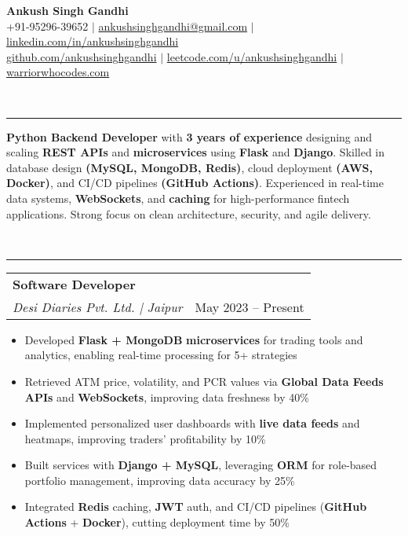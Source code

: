 \documentclass[a4paper,10.5pt]{article}
\makeatletter
\newcommand{\Section}[1]{\vspace{6pt}\noindent{\large\bfseries\MakeUppercase{#1}}\\\noindent\rule{\textwidth}{0.4pt}\vspace{6pt}}
\newcommand{\JobLine}[2]{\noindent\begin{tabular*}{\textwidth}{@{}l@{\extracolsep{\fill}}r@{}}#1 & #2\\\end{tabular*}}
\makeatother
\begin{document}
\vspace*{-0.9cm}
\begin{center}
  {\LARGE\bfseries Ankush Singh Gandhi}\\[3pt]
  +91-95296-39652 \; $|$ \; \href{mailto:ankushsinghgandhi@gmail.com}{ankushsinghgandhi@gmail.com} \; $|$ \; \href{https://linkedin.com/in/ankushsinghgandhi}{linkedin.com/in/ankushsinghgandhi} \\
  \href{https://github.com/ankushsinghgandhi}{github.com/ankushsinghgandhi} \; $|$ \; \href{https://leetcode.com/u/ankushsinghgandhi}{leetcode.com/u/ankushsinghgandhi} \; $|$ \; \href{https://warriorwhocodes.com/}{warriorwhocodes.com}
\end{center}

\Section{Summary}
{\small {\bfseries Python Backend Developer} with {\bfseries 3 years of experience} designing and scaling {\bfseries REST APIs} and {\bfseries microservices} using {\bfseries Flask} and {\bfseries Django}. Skilled in database design {\bfseries (MySQL, MongoDB, Redis)}, cloud deployment {\bfseries (AWS, Docker)}, and CI/CD pipelines {\bfseries (GitHub Actions)}. Experienced in real-time data systems, {\bfseries WebSockets}, and {\bfseries caching} for high-performance fintech applications. Strong focus on clean architecture, security, and agile delivery.}

\Section{Experience}

\JobLine{{\bfseries Software Developer}\\\textit{Desi Diaries Pvt. Ltd. | Jaipur}}{May 2023 -- Present}
\begin{itemize}
  \item Developed {\bfseries Flask + MongoDB} {\bfseries microservices} for trading tools and analytics, enabling real-time processing for 5+ strategies
  \item Retrieved ATM price, volatility, and PCR values via {\bfseries Global Data Feeds APIs} and {\bfseries WebSockets}, improving data freshness by 40\%
  \item Implemented personalized user dashboards with {\bfseries live data feeds} and heatmaps, improving traders' profitability by 10\%
  \item Built services with {\bfseries Django + MySQL}, leveraging {\bfseries ORM} for role-based portfolio management, improving data accuracy by 25\%
  \item Integrated {\bfseries Redis} caching, {\bfseries JWT} auth, and CI/CD pipelines ({\bfseries GitHub Actions} + {\bfseries Docker}), cutting deployment time by 50\% 
\end{itemize}
\end{document}
